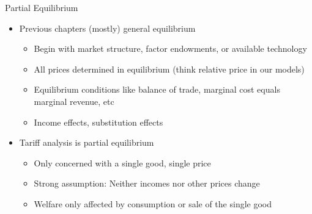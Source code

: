 \documentclass{beamer}
\begin{document}
\begin{frame}{Partial Equilibrium}

    \begin{itemize}
        \item Previous chapters (mostly) general equilibrium
        \begin{itemize}
            \item Begin with market structure, factor endowments, or available technology
            \item All prices determined in equilibrium (think relative price in our models)
            \item Equilibrium conditions like balance of trade, marginal cost equals marginal revenue, etc
            \item Income effects, substitution effects
        \end{itemize}
        \item Tariff analysis is partial equilibrium
        \begin{itemize}
            \item Only concerned with a single good, single price
            \item Strong assumption: Neither incomes nor other prices change
            \item Welfare only affected by consumption or sale of the single good
        \end{itemize}
    \end{itemize}

\end{frame}

\end{document}
